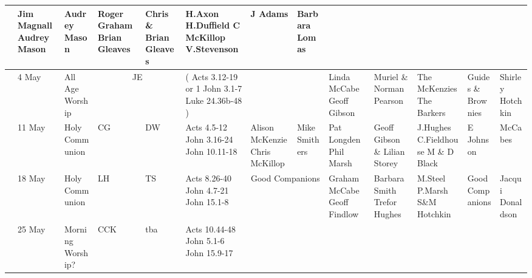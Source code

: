 \documentclass[10pt,a4paper]{article}
\begin{document}
\begin{center}
{\begin{tabular}{|l|p{1.6cm}|p{1.4cm}|p{1.0cm}|p{0.8cm}|p{3.0cm}|p{2cm}|p{1.5cm}|p{2cm}|p{2cm}|p{1.9cm}
|p{2cm}|p{1.6cm}|}
& Jim Magnall 
 Audrey Mason & Audrey Mason
  & Roger Graham Brian Gleaves & 
Chris \& Brian Gleaves  &
 H.Axon  \linebreak H.Duffield   C McKillop    V.Stevenson
 & J Adams & Barbara \linebreak Lomas \\
\hline
& 4 May & All Age Worship & \multicolumn{2}{|c|}{ JE }  &  
{\footnotesize (
Acts 3.12-19  or
1 John 3.1-7
Luke 24.36b-48
)}  &    & 
 & Linda McCabe Geoff Gibson & 
Muriel \& Norman Pearson &
The Mc\-Kenzies The Barkers
&  Guides \& Brownies & Shirley Hotchkin \\
\hline
& 11 May & Holy Communion
& CG & DW &    
Acts 4.5-12 \linebreak
1 John 3.16-24 \linebreak
John 10.11-18
& Alison McKenzie Chris McKillop  & 
Mike Smithers & Pat Longden  Phil Marsh & 
Geoff  Gibson \& Lilian Storey &
J.Hughes \linebreak C.Fieldhouse \linebreak M \& D Black
&  E Johnson & McCabes\\
\hline
& 18 May & Holy Communion
& LH & TS & 
Acts 8.26-40 \linebreak
1 John 4.7-21 \linebreak
John 15.1-8

    & \multicolumn{2}{|c|}{ Good Companions}  
 &  Graham McCabe \linebreak Geoff Findlow & 
Barbara Smith Trefor Hughes&
M.Steel P.Marsh \linebreak S\&M Hotchkin
&  Good Companions &  Jacqui Donaldson \\
\hline
& 25 May & Morning Worship?  
 &  CCK & tba & 

Acts 10.44-48 \linebreak
1 John 5.1-6 \linebreak
John 15.9-17 \linebreak


\end{tabular}}
\end{center}
\end{document}
